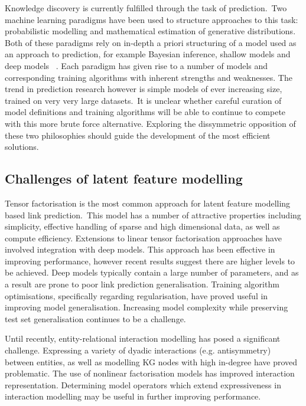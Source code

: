 \noindent Knowledge discovery is currently fulfilled through the task of prediction.\ Two machine learning paradigms have been used to structure approaches to this task: probabilistic modelling and mathematical estimation of generative distributions. Both of these paradigms rely on in-depth a priori structuring of a model used as an approach to prediction, for example Bayesian inference, shallow models and deep models \unskip~\citep{murphy2012machine}. Each paradigm has given rise to a number of models and corresponding training algorithms with inherent strengths and weaknesses. The trend in prediction research however is simple models of ever increasing size, trained on very very large datasets.\ It is unclear whether careful curation of model definitions and training algorithms will be able to continue to compete with this more brute force alternative. Exploring the dissymmetric opposition of these two philosophies should guide the development of the most efficient solutions.

\subsection{Challenges of latent feature modelling} 

Tensor factorisation is the most common approach for latent feature modelling based link prediction.\ This model has a number of attractive properties including simplicity, effective handling of sparse and high dimensional data, as well as compute efficiency. Extensions to linear tensor factorisation approaches have involved integration with deep models. This approach has been effective in improving performance, however recent results suggest there are higher levels to be achieved. Deep models typically contain a large number of parameters, and as a result are prone to poor link prediction generalisation. Training algorithm optimisations, specifically regarding regularisation, have proved useful in improving model generalisation. Increasing model complexity while preserving test set generalisation continues to be a challenge. \par

\noindent Until recently, entity-relational interaction modelling has posed a significant challenge. Expressing a variety of dyadic interactions (e.g. antisymmetry) between entities, as well as modelling KG nodes with high in-degree have proved problematic. The use of nonlinear factorisation models has improved interaction representation. Determining model operators which extend expressiveness in interaction modelling may be useful in further improving performance.\par

